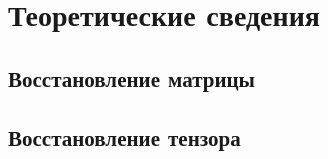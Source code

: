 \section{Теоретические сведения}
\subsection{Восстановление матрицы}
\clearpage
\subsection{Восстановление тензора}